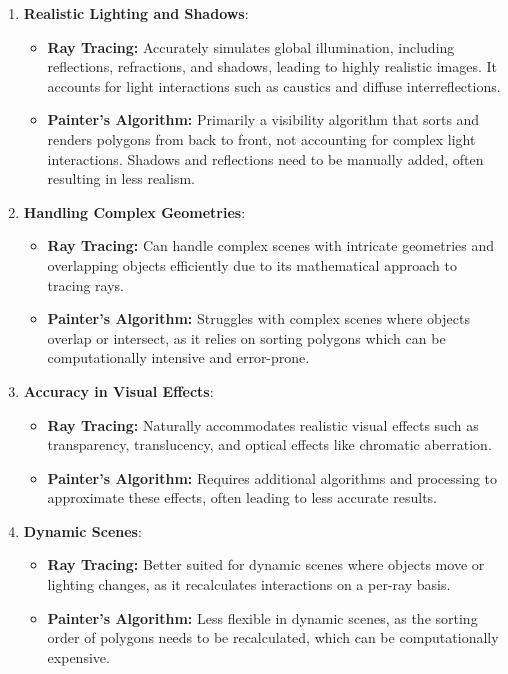\documentclass{article}
\begin{document}
\begin{enumerate}
    \item \textbf{Realistic Lighting and Shadows}:
    \begin{itemize}
        \item \textbf{Ray Tracing:} Accurately simulates global illumination, including reflections, refractions, and shadows, leading to highly realistic images. It accounts for light interactions such as caustics and diffuse interreflections.
        \item \textbf{Painter’s Algorithm:} Primarily a visibility algorithm that sorts and renders polygons from back to front, not accounting for complex light interactions. Shadows and reflections need to be manually added, often resulting in less realism.
    \end{itemize}
    \item \textbf{Handling Complex Geometries}:
    \begin{itemize}
        \item \textbf{Ray Tracing:} Can handle complex scenes with intricate geometries and overlapping objects efficiently due to its mathematical approach to tracing rays.
        \item \textbf{Painter’s Algorithm:} Struggles with complex scenes where objects overlap or intersect, as it relies on sorting polygons which can be computationally intensive and error-prone.
    \end{itemize}
    \item \textbf{Accuracy in Visual Effects}:
    \begin{itemize}
        \item \textbf{Ray Tracing:} Naturally accommodates realistic visual effects such as transparency, translucency, and optical effects like chromatic aberration.
        \item \textbf{Painter’s Algorithm:} Requires additional algorithms and processing to approximate these effects, often leading to less accurate results.
    \end{itemize}
    \item \textbf{Dynamic Scenes}:
    \begin{itemize}
        \item \textbf{Ray Tracing:} Better suited for dynamic scenes where objects move or lighting changes, as it recalculates interactions on a per-ray basis.
        \item \textbf{Painter’s Algorithm:} Less flexible in dynamic scenes, as the sorting order of polygons needs to be recalculated, which can be computationally expensive.
    \end{itemize}
\end{enumerate}
\end{document}
